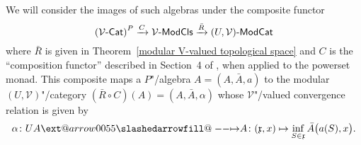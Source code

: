 \documentclass[preprint, a4paper]{elsarticle}
\makeatletter
\def\slashedarrowfill@#1#2#3#4#5{%
  $\m@th\thickmuskip0mu\medmuskip\thickmuskip\thinmuskip\thickmuskip
   \relax#5#1\mkern-7mu%
   \cleaders\hbox{$#5\mkern-2mu#2\mkern-2mu$}\hfill
   \mathclap{#3}\mathclap{#2}%
   \cleaders\hbox{$#5\mkern-2mu#2\mkern-2mu$}\hfill
   \mkern-7mu#4$%
}
\def\rightslashedarrowfill@{%
  \slashedarrowfill@\relbar\relbar\mapstochar\rightarrow}
\newcommand\xslashedrightarrow[2][]{%
  \ext@arrow 0055{\rightslashedarrowfill@}{#1}{#2}}
\def\slashedrightarrow{\xslashedrightarrow{}}
\theoremstyle{definition}
\theoremstyle{remark}
\providecommand{\thmref}[1]{Theorem~\ref{#1}}
\providecommand{\of}{\circ}
\providecommand{\xrar}[1]{\xrightarrow{#1}}
\providecommand{\mf}[1]{\mathfrak{#1}}
\providecommand{\pars}[1]{\left(#1\right)}
\providecommand{\bigpars}[1]{\bigl(#1\bigr)}
\providecommand{\hmap}[3]{#1\colon#2\slashedrightarrow#3}
\providecommand{\catvar}[1]{\mathcal{#1}}
\providecommand{\2}{\mathsf 2}
\providecommand{\V}{\catvar V}
\providecommand{\Cat}{\mathsf{Cat}}
\providecommand{\enCat}[1]{#1\text-\Cat}
\providecommand{\ModCls}[1]{#1\text-\mathsf{ModCls}}
\providecommand{\ModCat}[1]{#1\text-\mathsf{ModCat}}
\makeatother
\begin{document}
		We will consider the images of such algebras under the composite functor
	\begin{equation} \label{composite}
		\pars{\enCat\V}^P \xrar C \ModCls\V \xrar{\bar R} \ModCat{(U, \V)}
	\end{equation}	
	where $\bar R$ is given in \thmref{modular V-valued topological space} and $C$ is the ``composition functor'' described in Section~4 of \cite{Tholen09}, when applied to the powerset monad. This composite maps a $P$"/algebra $A = (A, \bar A, a)$ to the modular $(U, \V)$"/category $(\bar R \of C)(A) = (A, \bar A, \alpha)$ whose $\V$"/valued convergence relation is given by
	\begin{displaymath}
		\hmap\alpha{UA}A\colon (\mf x, x) \mapsto \inf_{S \in \mf x} \bar A\bigpars{a(S), x}.
	\end{displaymath}
	
\end{document}
